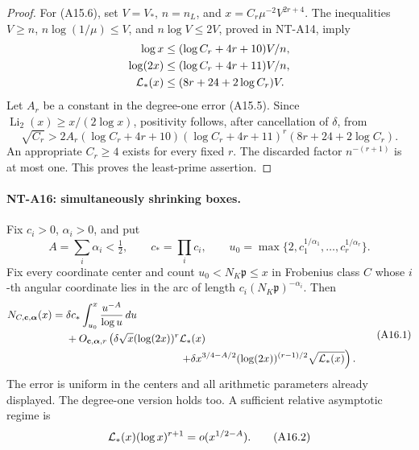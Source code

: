 \begin{proof}
For (A15.6), set \(V=V_*\), \(n=n_L\), and
\(x=C_r\mu^{-2}V^{2r+4}\). The inequalities
\(V\ge n\), \(n\log(1/\mu)\le V\), and
\(n\log V\le2V\), proved in NT-A14, imply
\[
 \begin{aligned}
 \log x&\le(\log C_r+4r+10)V/n,\\
 \log(2x)&\le(\log C_r+4r+11)V/n,\\
 {\cal L}_*(x)&\le(8r+24+2\log C_r)V.
 \end{aligned}
\]
Let \(A_r\) be a constant in the degree-one error
(A15.5). Since \(\operatorname{Li}_2(x)\ge x/(2\log x)\),
positivity follows, after cancellation of \(\delta\),
from
\[
 \sqrt{C_r}>
  2A_r(\log C_r+4r+10)(\log C_r+4r+11)^r
                    (8r+24+2\log C_r).
 \]
An appropriate \(C_r\ge4\) exists for every fixed \(r\).
The discarded factor \(n^{-(r+1)}\) is at most one.
This proves the least-prime assertion.
\end{proof}

\paragraph{NT-A16: simultaneously shrinking boxes.}
Fix \(c_i>0\), \(\alpha_i>0\), and put
\[
 A=\sum_i\alpha_i<\tfrac12,\qquad
 c_*=\prod_i c_i,\qquad
 u_0=\max\{2,c_1^{1/\alpha_1},\ldots,c_r^{1/\alpha_r}\}.
 \]
Fix every coordinate center and count \(u_0<N_K\mathfrak p\le x\)
in Frobenius class \(C\) whose \(i\)-th angular coordinate
lies in the arc of length \(c_i(N_K\mathfrak p)^{-\alpha_i}\).
Then
\[
 \begin{split}
 N_{C,\mathbf c,\boldsymbol\alpha}(x)
   ={}&\delta c_*\int_{u_0}^x\frac{u^{-A}}{\log u}\,du\\
     &+O_{\mathbf c,\boldsymbol\alpha,r}\left(
        \delta\sqrt x(\log(2x))^r{\cal L}_*(x)\right.\\
     &\hspace{38mm}\left.
        +\delta x^{3/4-A/2}
             (\log(2x))^{(r-1)/2}\sqrt{{\cal L}_*(x)}
                                    \right).
 \end{split}                                                   \tag{A16.1}
\]
The error is uniform in the centers and all arithmetic
parameters already displayed. The degree-one version
holds too. A sufficient relative asymptotic regime is
\[
          {\cal L}_*(x)(\log x)^{r+1}
                                  =o(x^{1/2-A}).           \tag{A16.2}
\]

